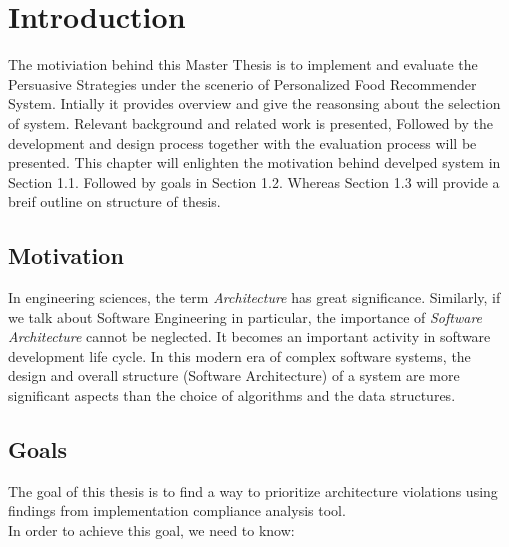 \chapter{Introduction}
\setcounter{page}{1}%
\thispagestyle{empty}


The motiviation behind this Master Thesis is to implement and evaluate the Persuasive Strategies under the scenerio of Personalized Food Recommender System. Intially it provides overview and give the reasonsing about the selection of system. Relevant background and related work is presented, Followed by the development and design process together with the evaluation process will be presented. \newline
This chapter will enlighten the motivation behind develped system in Section 1.1. Followed by goals in Section 1.2. Whereas Section 1.3 will provide a breif outline on structure of thesis.

\section{Motivation}\label{motivation}
In engineering sciences, the term \textit{Architecture} has great significance. Similarly, if we talk about Software Engineering in particular, the importance of \textit{Software Architecture} cannot be neglected. It becomes an important activity in software development life cycle. In this modern era of complex software systems, the design and overall structure (Software Architecture) of a system are more significant aspects than the choice of algorithms and the data structures.\newline

\section{Goals}
The goal of this thesis is to find a way to prioritize architecture violations using findings from implementation compliance analysis tool. \\In order to achieve this goal, we need to know:

